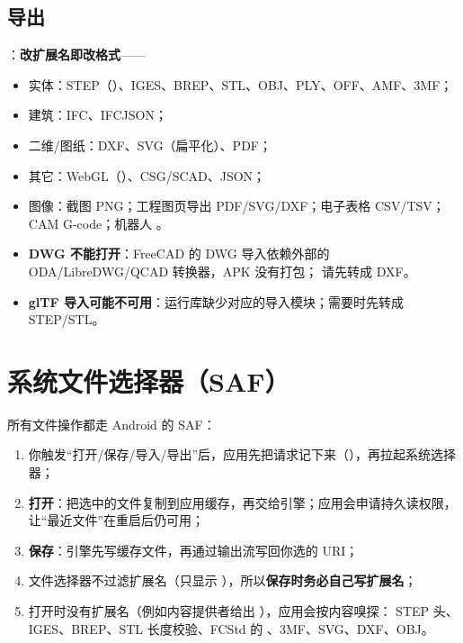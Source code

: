 \subsection{导出}

：\textbf{改扩展名即改格式}——

\begin{itemize}
  \item 实体：STEP（）、IGES、BREP、STL、OBJ、PLY、OFF、AMF、3MF；
  \item 建筑：IFC、IFCJSON；
  \item 二维/图纸：DXF、SVG（扁平化）、PDF；
  \item 其它：WebGL（）、CSG/SCAD、JSON；
  \item 图像：截图 PNG；工程图页导出 PDF/SVG/DXF；电子表格 CSV/TSV；CAM G-code；机器人 。
\end{itemize}

\begin{warn}[两件“不能”的事]
\begin{itemize}
  \item \textbf{DWG 不能打开}：FreeCAD 的 DWG 导入依赖外部的 ODA/LibreDWG/QCAD 转换器，APK 没有打包；
        请先转成 DXF。
  \item \textbf{glTF 导入可能不可用}：运行库缺少对应的导入模块；需要时先转成 STEP/STL。
\end{itemize}
\end{warn}

\section{系统文件选择器（SAF）}

所有文件操作都走 Android 的 SAF：

\begin{enumerate}
  \item 你触发“打开/保存/导入/导出”后，应用先把请求记下来（），再拉起系统选择器；
  \item \textbf{打开}：把选中的文件复制到应用缓存，再交给引擎；应用会申请持久读权限，让“最近文件”在重启后仍可用；
  \item \textbf{保存}：引擎先写缓存文件，再通过输出流写回你选的 URI；
  \item 文件选择器不过滤扩展名（只显示 \file{*/*}），所以\textbf{保存时务必自己写扩展名}；
  \item 打开时没有扩展名（例如内容提供者给出 ），应用会按内容嗅探：
        STEP 头、IGES、BREP、STL 长度校验、FCStd 的 、3MF、SVG、DXF、OBJ。
\end{enumerate}

